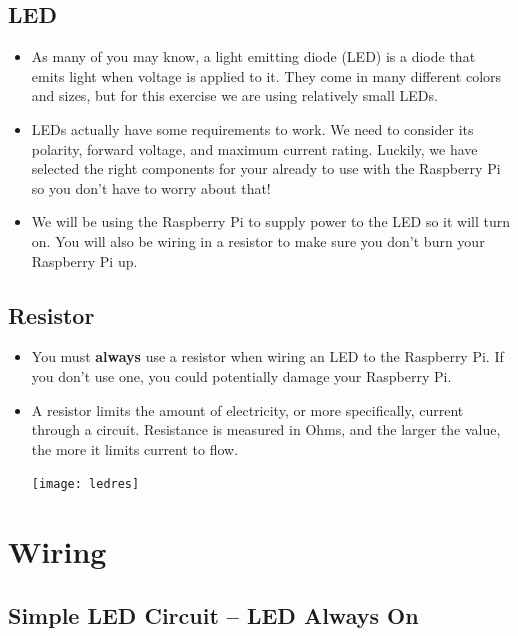 \documentclass{article}\usepackage[]{graphicx}\usepackage[]{color}
\begin{document}
\subsection{LED}

\begin{itemize}
\item As many of you may know, a light emitting diode (LED) is a diode that emits light when voltage is applied to it. They come in many different colors and sizes, but for this exercise we are using relatively small LEDs.
\item LEDs actually have some requirements to work. We need to consider its polarity, forward voltage, and maximum current rating. Luckily, we have selected the right components for your already to use with the Raspberry Pi so you don't have to worry about that!
\item We will be using the Raspberry Pi to supply power to the LED so it will turn on. You will also be wiring in a resistor to make sure you don't burn your Raspberry Pi up.
\end{itemize}

\subsection{Resistor}

\begin{itemize}
\item You must \textbf{always} use a resistor when wiring an LED to the Raspberry Pi. If you don't use one, you could potentially damage your Raspberry Pi.
\item A resistor limits the amount of electricity, or more specifically, current through a circuit. Resistance is measured in Ohms, and the larger the value, the more it limits current to flow.
\newline
\begin{center}
\texttt{[image: ledres]}
\end{center}
\end{itemize}

\section{Wiring}

\subsection{Simple LED Circuit -- LED Always On}
\end{document}
